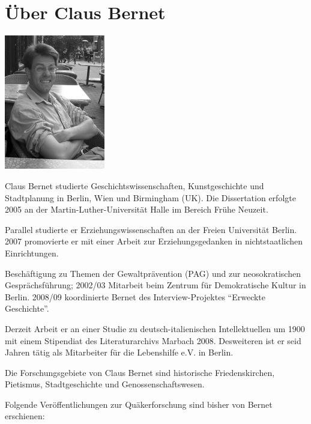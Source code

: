 \chapter{Über Claus Bernet}

\begin{floatingfigure}[l]{0.33\textwidth}
\includegraphics[width=0.33\textwidth]{claus_bernet_bw}
\end{floatingfigure}

Claus Bernet studierte Geschichtswissenschaften, Kunstgeschichte und
Stadtplanung in Berlin, Wien und Birmingham (UK). Die Dissertation erfolgte 2005
an der Martin-Luther-Universität Halle im Bereich Frühe Neuzeit.

\medskip

Parallel studierte er Erziehungswissenschaften an der Freien Universität Berlin.
2007 promovierte er mit einer Arbeit zur Erziehungsgedanken in nichtstaatlichen
Einrichtungen.

\medskip

Beschäftigung zu Themen der Gewaltprävention (PAG) und zur neosokratischen
Gesprächsführung; 2002/03 Mitarbeit beim Zentrum für Demokratische Kultur in
Berlin. 2008/09 koordinierte Bernet des Interview-Projektes "`Erweckte
Geschichte"'.

\medskip

Derzeit Arbeit er an einer Studie zu deutsch-italienischen Intellektuellen um
1900 mit einem Stipendiat des Literaturarchivs Marbach 2008. Desweiteren ist er
seid Jahren tätig als Mitarbeiter für die Lebenshilfe e.V. in Berlin.

\medskip

Die Forschungsgebiete von Claus Bernet sind historische Friedenskirchen,
Pietismus, Stadtgeschichte und Genossenschaftswesen.

\medskip

Folgende Veröffentlichungen zur Quäkerforschung sind bisher von Bernet
erschienen:

